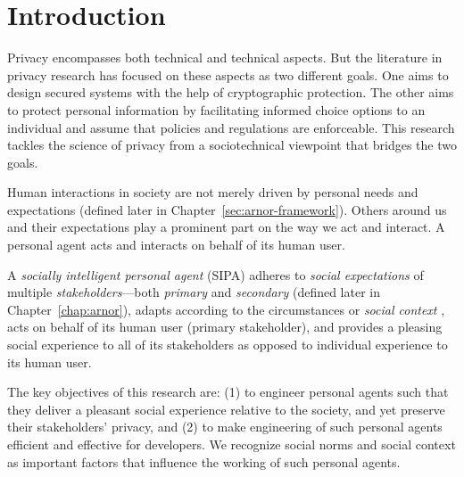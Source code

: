 \documentclass[11pt,          %
               phd,           %
               onehalfspacing %
               ]{ncsuthesis}
\newlength{\chapterfootskip}
\begin{document}
\pagestyle{plain}
\frontmatter



\mainmatter



\pagestyle{plain}

\chapter{Introduction}
\label{chap:intro}

Privacy encompasses both technical and technical aspects. But the
literature in privacy research has focused on these aspects as two
different goals.  One aims to design secured systems with the help of
cryptographic protection. The other aims to protect personal information
by facilitating informed choice options to an individual and assume that
policies and regulations are enforceable. This research tackles
the science of privacy from a sociotechnical viewpoint that bridges the 
two goals.

Human interactions in society are not merely driven by personal needs
and expectations (defined later in Chapter~\ref{sec:arnor-framework}). 
Others around us and their expectations play a
prominent part on the way we act and interact. A personal agent acts and
interacts on behalf of its human user. 

A \emph{socially intelligent personal agent} (SIPA) adheres to
\emph{social expectations} of multiple \emph{stakeholders}---both
\emph{primary} and \emph{secondary} (defined later in
Chapter~\ref{chap:arnor}), adapts according to the circumstances or
\emph{social context} \citep{Dey-2001-Context}, acts on behalf of its
human user (primary stakeholder), and provides a pleasing social
experience to all of its stakeholders as opposed to individual
experience to its human user.


The key objectives of this research are: (1) to engineer personal agents
such that they deliver a pleasant social experience relative to the
society, and yet preserve their stakeholders' privacy, and (2) to make
engineering of such personal agents efficient and effective for
developers. We recognize social norms and social context as important
factors that influence the working of such personal agents.
\end{document}
